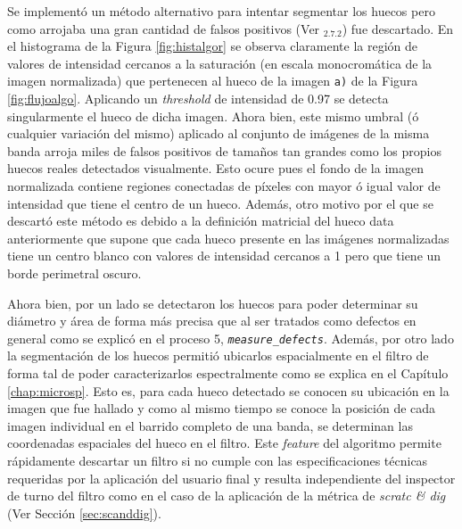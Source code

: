 \begin{enumerate}
\hspace{0.5cm}Se implementó un método alternativo para intentar segmentar los huecos pero como arrojaba una gran cantidad de falsos positivos (Ver \href{https://github.com/jrr1984/defects_analysis/blob/master/find_contours_holes_trial.py}{\faGithub$_{2.7.2}$}) fue descartado. En el histograma de la Figura \ref{fig:histalgor} se observa claramente la región de valores de intensidad cercanos a la saturación (en escala monocromática de la imagen normalizada) que pertenecen al hueco de la imagen \texttt{a)} de la Figura \ref{fig:flujoalgo}. Aplicando un \textit{threshold} de intensidad de 0.97 se detecta singularmente el hueco de dicha imagen. Ahora bien, este mismo umbral (ó cualquier variación del mismo) aplicado al conjunto de imágenes de la misma banda arroja miles de falsos positivos de tamaños tan grandes como los propios huecos reales detectados visualmente. Esto ocure pues el fondo de la imagen normalizada contiene regiones conectadas de píxeles con mayor ó igual valor de intensidad que tiene el centro de un hueco. Además, otro motivo por el que se descartó este método es debido a la definición matricial del hueco data anteriormente que supone que cada hueco presente en las imágenes normalizadas tiene un centro blanco con valores de intensidad cercanos a 1 pero que tiene un borde perimetral oscuro.

\hspace{0.5cm}Ahora bien, por un lado se detectaron los huecos para poder determinar su diámetro y área de forma más precisa que al ser tratados como defectos en general como se explicó en el proceso 5, \texttt{\textit{measure\_defects}}. Además, por otro lado la segmentación de los huecos permitió ubicarlos espacialmente en el filtro de forma tal de poder caracterizarlos espectralmente como se explica en el Capítulo \ref{chap:microsp}. Esto es, para cada hueco detectado se conocen su ubicación en la imagen que fue hallado y como al mismo tiempo se conoce la posición de cada imagen individual en el barrido completo de una banda, se determinan las coordenadas espaciales del hueco en el filtro. Este \textit{feature} del algoritmo permite rápidamente descartar un filtro si no cumple con las especificaciones técnicas requeridas por la aplicación del usuario final y resulta independiente del inspector de turno del filtro como en el caso de la aplicación de la métrica de \textit{scratc \& dig} (Ver Sección \ref{sec:scanddig}).


\end{enumerate}
